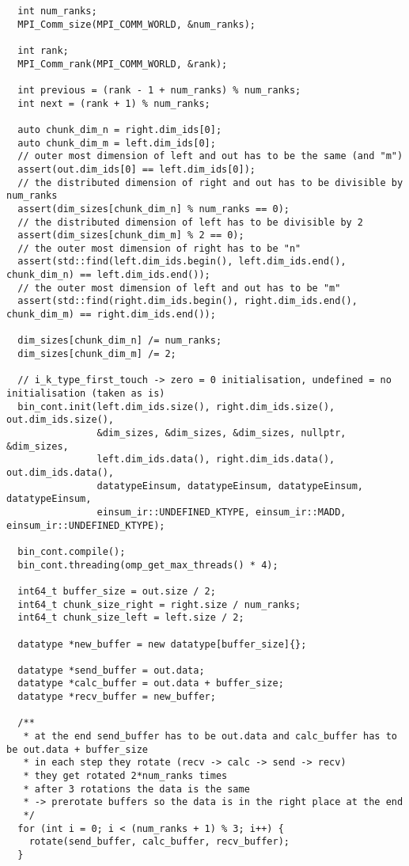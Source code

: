 {\begin{verbatim}
  int num_ranks;
  MPI_Comm_size(MPI_COMM_WORLD, &num_ranks);

  int rank;
  MPI_Comm_rank(MPI_COMM_WORLD, &rank);

  int previous = (rank - 1 + num_ranks) % num_ranks;
  int next = (rank + 1) % num_ranks;

  auto chunk_dim_n = right.dim_ids[0];
  auto chunk_dim_m = left.dim_ids[0];
  // outer most dimension of left and out has to be the same (and "m")
  assert(out.dim_ids[0] == left.dim_ids[0]);
  // the distributed dimension of right and out has to be divisible by num_ranks
  assert(dim_sizes[chunk_dim_n] % num_ranks == 0);
  // the distributed dimension of left has to be divisible by 2
  assert(dim_sizes[chunk_dim_m] % 2 == 0);
  // the outer most dimension of right has to be "n"
  assert(std::find(left.dim_ids.begin(), left.dim_ids.end(), chunk_dim_n) == left.dim_ids.end());
  // the outer most dimension of left and out has to be "m"
  assert(std::find(right.dim_ids.begin(), right.dim_ids.end(), chunk_dim_m) == right.dim_ids.end());

  dim_sizes[chunk_dim_n] /= num_ranks;
  dim_sizes[chunk_dim_m] /= 2;

  // i_k_type_first_touch -> zero = 0 initialisation, undefined = no initialisation (taken as is)
  bin_cont.init(left.dim_ids.size(), right.dim_ids.size(), out.dim_ids.size(),
                &dim_sizes, &dim_sizes, &dim_sizes, nullptr, &dim_sizes,
                left.dim_ids.data(), right.dim_ids.data(), out.dim_ids.data(),
                datatypeEinsum, datatypeEinsum, datatypeEinsum, datatypeEinsum,
                einsum_ir::UNDEFINED_KTYPE, einsum_ir::MADD, einsum_ir::UNDEFINED_KTYPE);

  bin_cont.compile();
  bin_cont.threading(omp_get_max_threads() * 4);

  int64_t buffer_size = out.size / 2;
  int64_t chunk_size_right = right.size / num_ranks;
  int64_t chunk_size_left = left.size / 2;

  datatype *new_buffer = new datatype[buffer_size]{};

  datatype *send_buffer = out.data;
  datatype *calc_buffer = out.data + buffer_size;
  datatype *recv_buffer = new_buffer;

  /**
   * at the end send_buffer has to be out.data and calc_buffer has to be out.data + buffer_size
   * in each step they rotate (recv -> calc -> send -> recv)
   * they get rotated 2*num_ranks times
   * after 3 rotations the data is the same
   * -> prerotate buffers so the data is in the right place at the end
   */
  for (int i = 0; i < (num_ranks + 1) % 3; i++) {
    rotate(send_buffer, calc_buffer, recv_buffer);
  }


\end{verbatim}}

